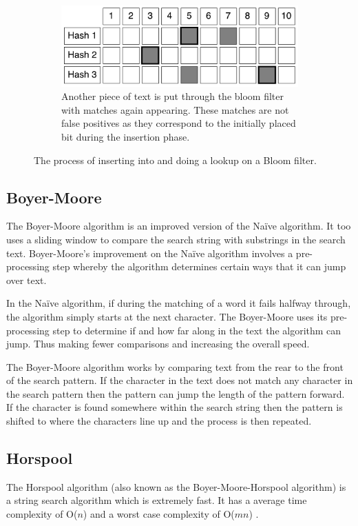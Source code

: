\documentclass{article}
\begin{document}
\begin{figure}[h!bt]
  \ContinuedFloat  
  \label{bloom-6}
  \centering
  \begin{subfigure}{\textwidth}
  \makeatletter
  \includegraphics[width=\textwidth]{images/bloom-6}
  \caption{Another piece of text is put through the bloom filter with matches again appearing. These matches are not false positives as they correspond to the initially placed bit during the insertion phase.}
  \end{subfigure}
  \caption{The process of inserting into and doing a lookup on a Bloom filter.}
\end{figure}

\subsection{Boyer-Moore} \label{boyer-moore}

The Boyer-Moore algorithm \citep{Boyer1977} is an improved version of the Na{\"i}ve algorithm. It too uses a sliding window to compare the search string with substrings in the search text. Boyer-Moore's improvement on the Na{\"i}ve algorithm involves a pre-processing step whereby the algorithm determines certain ways that it can jump over text.

In the Na{\"i}ve algorithm, if during the matching of a word it fails halfway through, the algorithm simply starts at the next character. The Boyer-Moore uses its pre-processing step to determine if and how far along in the text the algorithm can jump. Thus making fewer comparisons and increasing the overall speed.

The Boyer-Moore algorithm works by comparing text from the rear to the front of the search pattern. If the character in the text does not match any character in the search pattern then the pattern can jump the length of the pattern forward. If the character is found somewhere within the search string then the pattern is shifted to where the characters line up and the process is then repeated.

\subsection{Horspool}
The Horspool algorithm \citep{Horspool1980} (also known as the Boyer-Moore-Horspool algorithm) is a string search algorithm which is extremely fast. It has a average time complexity of O(\(n\)) and a worst case complexity of O(\(mn\)) \citep{Horspool1980}.
\end{document}
